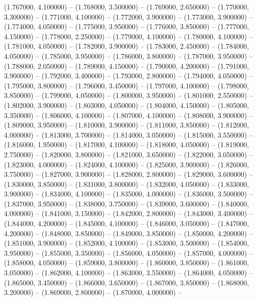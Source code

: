 (1.767000, 4.100000) -- 
(1.768000, 3.500000) -- 
(1.769000, 2.650000) -- 
(1.770000, 3.300000) -- 
(1.771000, 4.100000) -- 
(1.772000, 3.900000) -- 
(1.773000, 3.900000) -- 
(1.774000, 4.050000) -- 
(1.775000, 3.950000) -- 
(1.776000, 3.850000) -- 
(1.777000, 4.150000) -- 
(1.778000, 2.250000) -- 
(1.779000, 4.100000) -- 
(1.780000, 4.100000) -- 
(1.781000, 4.050000) -- 
(1.782000, 3.900000) -- 
(1.783000, 2.450000) -- 
(1.784000, 4.050000) -- 
(1.785000, 3.950000) -- 
(1.786000, 3.800000) -- 
(1.787000, 3.950000) -- 
(1.788000, 2.050000) -- 
(1.789000, 4.150000) -- 
(1.790000, 4.200000) -- 
(1.791000, 3.900000) -- 
(1.792000, 3.400000) -- 
(1.793000, 2.800000) -- 
(1.794000, 4.050000) -- 
(1.795000, 3.800000) -- 
(1.796000, 3.450000) -- 
(1.797000, 4.100000) -- 
(1.798000, 3.850000) -- 
(1.799000, 4.050000) -- 
(1.800000, 3.950000) -- 
(1.801000, 2.550000) -- 
(1.802000, 3.900000) -- 
(1.803000, 4.050000) -- 
(1.804000, 4.150000) -- 
(1.805000, 3.350000) -- 
(1.806000, 4.100000) -- 
(1.807000, 4.100000) -- 
(1.808000, 3.900000) -- 
(1.809000, 3.950000) -- 
(1.810000, 3.900000) -- 
(1.811000, 3.850000) -- 
(1.812000, 4.000000) -- 
(1.813000, 3.700000) -- 
(1.814000, 3.050000) -- 
(1.815000, 3.550000) -- 
(1.816000, 1.950000) -- 
(1.817000, 4.100000) -- 
(1.818000, 4.050000) -- 
(1.819000, 2.750000) -- 
(1.820000, 3.800000) -- 
(1.821000, 3.650000) -- 
(1.822000, 3.050000) -- 
(1.823000, 4.000000) -- 
(1.824000, 4.100000) -- 
(1.825000, 3.900000) -- 
(1.826000, 3.750000) -- 
(1.827000, 3.900000) -- 
(1.828000, 2.800000) -- 
(1.829000, 3.600000) -- 
(1.830000, 3.850000) -- 
(1.831000, 3.800000) -- 
(1.832000, 4.050000) -- 
(1.833000, 3.900000) -- 
(1.834000, 4.100000) -- 
(1.835000, 4.000000) -- 
(1.836000, 3.500000) -- 
(1.837000, 3.950000) -- 
(1.838000, 3.750000) -- 
(1.839000, 3.600000) -- 
(1.840000, 4.000000) -- 
(1.841000, 3.150000) -- 
(1.842000, 2.800000) -- 
(1.843000, 3.400000) -- 
(1.844000, 4.200000) -- 
(1.845000, 4.100000) -- 
(1.846000, 3.050000) -- 
(1.847000, 4.200000) -- 
(1.848000, 3.850000) -- 
(1.849000, 3.850000) -- 
(1.850000, 4.200000) -- 
(1.851000, 3.900000) -- 
(1.852000, 4.100000) -- 
(1.853000, 3.500000) -- 
(1.854000, 3.950000) -- 
(1.855000, 3.350000) -- 
(1.856000, 4.050000) -- 
(1.857000, 4.000000) -- 
(1.858000, 4.050000) -- 
(1.859000, 3.800000) -- 
(1.860000, 3.850000) -- 
(1.861000, 3.050000) -- 
(1.862000, 4.100000) -- 
(1.863000, 3.550000) -- 
(1.864000, 4.050000) -- 
(1.865000, 3.450000) -- 
(1.866000, 3.650000) -- 
(1.867000, 3.850000) -- 
(1.868000, 3.200000) -- 
(1.869000, 2.800000) -- 
(1.870000, 4.000000) -- 
